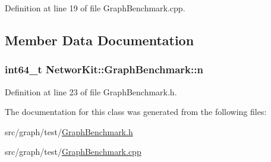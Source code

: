 Definition at line 19 of file Graph\-Benchmark.\-cpp.



\subsection{Member Data Documentation}
\hypertarget{class_networ_kit_1_1_graph_benchmark_ae3243c874ccfe0a1cfa50e4ada65deaf}{
\subsubsection[{n}]{\setlength{\rightskip}{0pt plus 5cm}int64\-\_\-t Networ\-Kit\-::\-Graph\-Benchmark\-::n\hspace{0.3cm}{\ttfamily [protected]}}}\label{class_networ_kit_1_1_graph_benchmark_ae3243c874ccfe0a1cfa50e4ada65deaf}


Definition at line 23 of file Graph\-Benchmark.\-h.



The documentation for this class was generated from the following files\-:\begin{DoxyCompactItemize}
\item 
src/graph/test/\hyperlink{_graph_benchmark_8h}{Graph\-Benchmark.\-h}\item 
src/graph/test/\hyperlink{_graph_benchmark_8cpp}{Graph\-Benchmark.\-cpp}\end{DoxyCompactItemize}
